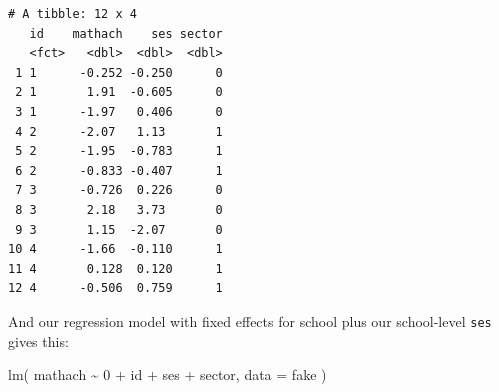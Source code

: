 \documentclass[
  letterpaper,
  DIV=11,
  numbers=noendperiod]{scrreprt}
\newenvironment{Shaded}{}{}
\newcommand{\AttributeTok}[1]{\textcolor[rgb]{0.49,0.56,0.16}{#1}}
\newcommand{\DecValTok}[1]{\textcolor[rgb]{0.25,0.63,0.44}{#1}}
\newcommand{\FunctionTok}[1]{\textcolor[rgb]{0.02,0.16,0.49}{#1}}
\newcommand{\NormalTok}[1]{#1}
\newcommand{\OtherTok}[1]{\textcolor[rgb]{0.00,0.44,0.13}{#1}}
\newcommand{\SpecialCharTok}[1]{\textcolor[rgb]{0.25,0.44,0.63}{#1}}
\begin{document}
\begin{Shaded}
\end{Shaded}

\begin{verbatim}
# A tibble: 12 x 4
   id    mathach    ses sector
   <fct>   <dbl>  <dbl>  <dbl>
 1 1      -0.252 -0.250      0
 2 1       1.91  -0.605      0
 3 1      -1.97   0.406      0
 4 2      -2.07   1.13       1
 5 2      -1.95  -0.783      1
 6 2      -0.833 -0.407      1
 7 3      -0.726  0.226      0
 8 3       2.18   3.73       0
 9 3       1.15  -2.07       0
10 4      -1.66  -0.110      1
11 4       0.128  0.120      1
12 4      -0.506  0.759      1
\end{verbatim}

And our regression model with fixed effects for school plus our
school-level \texttt{ses} gives this:

\begin{Shaded}
\begin{Highlighting}[]
\FunctionTok{lm}\NormalTok{( mathach }\SpecialCharTok{\textasciitilde{}} \DecValTok{0} \SpecialCharTok{+}\NormalTok{ id }\SpecialCharTok{+}\NormalTok{ ses }\SpecialCharTok{+}\NormalTok{ sector, }\AttributeTok{data =}\NormalTok{ fake )}
\end{Highlighting}
\end{Shaded}
\end{document}
